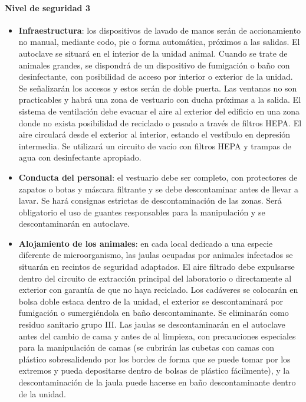 \paragraph{Nivel de seguridad 3}
\begin{itemize}[itemsep=0pt,parsep=0pt,topsep=0pt,partopsep=0pt]
    \item \textbf{Infraestructura}: los dispositivos de lavado de manos serán de accionamiento no manual, mediante codo, pie o forma automática, próximos a las salidas. El autoclave se situará en el interior de la unidad animal. Cuando se trate de animales grandes, se dispondrá de un dispositivo de fumigación o baño con desinfectante, con posibilidad de acceso por interior o exterior de la unidad. Se señalizarán los accesos y estos serán de doble puerta. Las ventanas no son practicables y habrá una zona de vestuario con ducha próximas a la salida. El sistema de ventilación debe evacuar el aire al exterior del edificio en una zona donde no exista posibilidad de reciclado o pasado a través de filtros HEPA. El aire circulará desde el exterior al interior, estando el vestíbulo en depresión intermedia. Se utilizará un circuito de vacío con filtros HEPA y trampas de agua con desinfectante apropiado.
    \item \textbf{Conducta del personal}: el vestuario debe ser completo, con protectores de zapatos o botas y máscara filtrante y se debe descontaminar antes de llevar a lavar. Se hará consignas estrictas de descontaminación de las zonas. Será obligatorio el uso de guantes responsables para la manipulación y se descontaminarán en autoclave. 
    \item \textbf{Alojamiento de los animales}: en cada local dedicado a una especie diferente de microorganismo, las jaulas ocupadas por animales infectados se situarán en recintos de seguridad adaptados. El aire filtrado debe expulsarse dentro del circuito de extracción principal del laboratorio o directamente al exterior con garantía de que no haya reciclado. Los cadáveres se colocarán en bolsa doble estaca dentro de la unidad, el exterior se descontaminará por fumigación o sumergiéndola en baño descontaminante. Se eliminarán como residuo sanitario grupo III. Las jaulas se descontaminarán en el autoclave antes del cambio de cama y antes de al limpieza, con precauciones especiales para la manipulación de camas (se cubrirán las cubetas con camas con plástico sobresalidendo por los bordes de forma que se puede tomar por los extremos y pueda depositarse dentro de bolsas de plástico fácilmente), y la descontaminación de la jaula puede hacerse en baño descontaminante dentro de la unidad.
\end{itemize}
